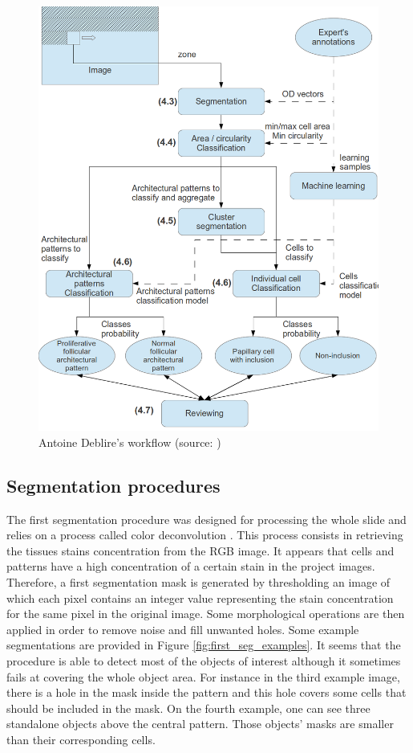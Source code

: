 \begin{figure}
	\center
 	\includegraphics[scale=0.95]{image/adeblire_workflow.png}
	\caption{Antoine Deblire's workflow (source: \cite{adeblire2013})}
	\label{fig:workflow_adeblire}
\end{figure}

\subsection{Segmentation procedures}
The first segmentation procedure was designed for processing the whole slide and relies on a process called color deconvolution \cite{ruifrok2001quantification}. This process consists in retrieving the tissues stains concentration from the RGB image. It appears that cells and patterns have a high concentration of a certain stain in the project images. Therefore, a first segmentation mask is generated by thresholding an image of which each pixel contains an integer value representing the stain concentration for the same pixel in the original image. Some morphological operations are then applied in order to remove noise and fill unwanted holes. Some example segmentations are provided in Figure \ref{fig:first_seg_examples}. It seems that the procedure is able to detect most of the objects of interest although it sometimes fails at covering the whole object area. For instance in the third example image, there is a hole in the mask inside the pattern and this hole covers some cells that should be included in the mask. On the fourth example, one can see three standalone objects above the central pattern. Those objects' masks are smaller than their corresponding cells.

